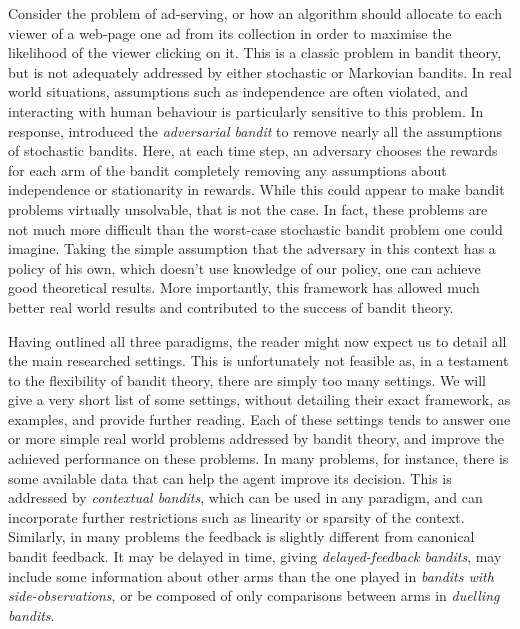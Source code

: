 \par Consider the problem of ad-serving, or how an algorithm should allocate to each viewer of a web-page one ad from its collection in order to maximise the likelihood of the viewer clicking on it. This is a classic problem in bandit theory\cite{vernade:2017,dudik:2011}, but is not adequately addressed by either stochastic or Markovian bandits. In real world situations, assumptions such as independence are often violated, and interacting with human behaviour is particularly sensitive to this problem. In response, \citet{auer:1995} introduced the {\em adversarial bandit} to remove nearly all the assumptions of stochastic bandits. Here, at each time step, an adversary chooses the rewards for each arm of the bandit completely removing any assumptions about independence or stationarity in rewards. While this could appear to make bandit problems virtually unsolvable, that is not the case. In fact, these problems are not much more difficult than the worst-case stochastic bandit problem one could imagine\cite{bubeck:2012}. Taking the simple assumption that the adversary in this context has a policy of his own, which doesn't use knowledge of our policy, one can achieve good theoretical results. More importantly, this framework has allowed much better real world results and contributed to the success of bandit theory.

\par Having outlined all three paradigms, the reader might now expect us to detail all the main researched settings. This is unfortunately not feasible as, in a testament to the flexibility of bandit theory, there are simply too many settings.  We will give a very short list of some settings, without detailing their exact framework, as examples, and provide further reading. Each of these settings tends to answer one or more simple real world problems addressed by bandit theory, and improve the achieved performance on these problems. In many problems, for instance, there is some available data that can help the agent improve its decision. This is addressed\cite{banditalgs:11} by {\em contextual bandits}, which can be used in any paradigm, and can incorporate further restrictions such as linearity or sparsity of the context. Similarly, in many problems the feedback is slightly different from canonical bandit feedback. It may be delayed in time, giving {\em delayed-feedback bandits}\cite{dudik:2011}, may include some information about other arms than the one played in {\em bandits with side-observations}\cite{mannor:2011}, or be composed of only comparisons between arms in {\em duelling bandits}\cite{yue:2009}. 

